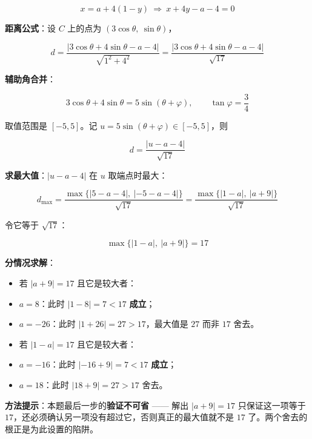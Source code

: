 \begin{answer}
\nopagebreak[4]
\[x=a+4(1-y)\ \Longrightarrow\ x+4y-a-4=0\]

\textbf{距离公式}：设 $C$ 上的点为 $(3\cos\theta,\ \sin\theta)$，

\nopagebreak[4]
\[d=\frac{|3\cos\theta+4\sin\theta-a-4|}{\sqrt{1^{2}+4^{2}}}=\frac{|3\cos\theta+4\sin\theta-a-4|}{\sqrt{17}}\]

\textbf{辅助角合并}：

\nopagebreak[4]
\[3\cos\theta+4\sin\theta=5\sin(\theta+\varphi),\qquad \tan\varphi=\frac34\]

取值范围是 $[-5,5]$。记 $u=5\sin(\theta+\varphi)\in[-5,5]$，则

\nopagebreak[4]
\[d=\frac{|u-a-4|}{\sqrt{17}}\]

\textbf{求最大值}：$|u-a-4|$ 在 $u$ 取端点时最大：

\nopagebreak[4]
\[d_{\max}=\frac{\max\{|5-a-4|,\ |-5-a-4|\}}{\sqrt{17}}=\frac{\max\{|1-a|,\ |a+9|\}}{\sqrt{17}}\]

令它等于 $\sqrt{17}$：

\nopagebreak[4]
\[\max\{|1-a|,\ |a+9|\}=17\]

\textbf{分情况求解}：

\begin{itemize}
\item 若 $|a+9|=17$ 且它是较大者：
\item $a=8$：此时 $|1-8|=7<17$  \textbf{成立}；
\item $a=-26$：此时 $|1+26|=27>17$，最大值是 $27$ 而非 $17$  舍去。
\item 若 $|1-a|=17$ 且它是较大者：
\item $a=-16$：此时 $|-16+9|=7<17$  \textbf{成立}；
\item $a=18$：此时 $|18+9|=27>17$  舍去。
\end{itemize}

\begin{gktip}
\textbf{方法提示}：本题最后一步的\textbf{验证不可省} —— 解出 $|a+9|=17$ 只保证这一项等于 $17$，还必须确认另一项没有超过它，否则真正的最大值就不是 $17$ 了。两个舍去的根正是为此设置的陷阱。
\end{gktip}



\par\medskip

\end{answer}
